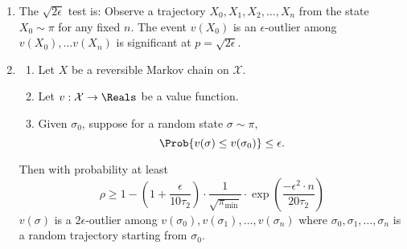 \documentclass[12pt]{article}
\begin{document}
\begin{enumerate}
    \item
        The \( \sqrt{2\epsilon} \) test is:  Observe a trajectory \( X_0,
        X_1, X_2, \dots, X_n \) from the state  \( X_0 \sim \pi \) for any fixed \(
        n \).  The event \( v(X_0) \) is an \( \epsilon \)-outlier among
        \( v(X_0), \dots v(X_n ) \) is significant at \( p = \sqrt {2\epsilon}
        \).
    \item \begin{theorem}
    \begin{enumerate}
        \item
            Let \( X \) be a reversible Markov chain on \( \mathcal{X} \).
        \item
            Let \( v :  \mathcal{X} \to \Reals \) be a value function.
        \item
            Given \( \sigma_0 \), suppose for a random state \( \sigma
            \sim \pi \),
            \[
                \Prob{v(\sigma) \le v(\sigma_0)} \le \epsilon.
            \]
    \end{enumerate}
    Then with probability at least
    \[
        \rho \ge 1 - \left( 1 + \frac{\epsilon}{10 \tau_2} \right) \cdot
        \frac{1}{\sqrt{\pi_{\min}}} \cdot \exp \left( \frac {-\epsilon^
        {2} \cdot n}{20 \tau_{2}} \right)
    \] \( v(\sigma) \) is a \( 2\epsilon \)-outlier among \( v(\sigma_0),
    v(\sigma_1), \dots, v(\sigma_n) \) where \( \sigma_0, \sigma_1,
    \dots, \sigma_n \) is a random trajectory starting from \( \sigma_0 \).
\end{theorem}
\end{enumerate}

\hr

\end{document}
